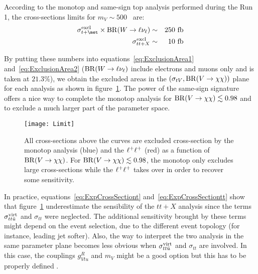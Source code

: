  According to the monotop and same-sign top analysis performed during the Run 1, the cross-sections limits for $m_V \sim 500$~\GeV{} are:
 \begin{eqnarray}
  \sigma^{\rm{excl}}_{t+\met} \times \BR{W}{\ell\nu_{\ell}} &\sim& 250~\rm{fb}\\
  \sigma^{\rm{excl}}_{tt+X}   &\sim&  10~\rm{fb}
 \end{eqnarray}

 By putting these numbers into equations~\eqref{eq:ExclusionArea1} and~\eqref{eq:ExclusionArea2} ($\mathrm{BR}({W} \to {\ell\nu_{\ell}})$ include electrons and muons only and is taken at $21.3\%$), 
 we obtain the excluded areas in the $(\sigma_{tV},\mathrm{BR}({V} \to {\chi\chi}))$ plane for each analysis as shown in figure~\ref{fig:Limit}.
 The power of the same-sign signature offers a nice way to complete the monotop analysis for $\mathrm{BR}({V} \to {\chi\chi}) \lesssim 0.98$ and to exclude a much larger part of the parameter space.

 \begin{figure}[htbp]
  \centering
  \texttt{[image: Limit]}
  \caption{All cross-sections above the curves are excluded cross-section by the monotop analysis (blue) and the $\ell^{+}\ell^{+}$ (red) as a function of $\mathrm{BR}({V} \to {\chi\chi})$. For $\mathrm{BR}({V} \to {\chi\chi})\lesssim 0.98$, 
  the monotop only excludes large cross-sections while the $\ell^{+}\ell^{+}$ takes over in order to recover some sensitivity.}
  \label{fig:Limit}
\end{figure}

In practice, equations~\eqref{eq:ExpCrossSectiont} and~\eqref{eq:ExpCrossSectiontt} show that figure~\ref{fig:Limit} underestimate the sensibility of the $tt+X$ analysis since the terms 
$\sigma^{\rm{virt}}_{tt\bar{u}}$ and $\sigma_{tt}$ were neglected. The additional sensitivity brought by these terms might depend on the event selection, due
to the different event topology (for instance, leading jet softer). Also, the way to interpret the two analysis in the same parameter plane becomes less obvious
when $\sigma^{\rm{virt}}_{tt\bar{u}}$ and $\sigma_{tt}$ are involved. In this case, the couplings $g^{R}_{Vtu}$ and $m_V$ might be a good option but this has to
be properly defined .
